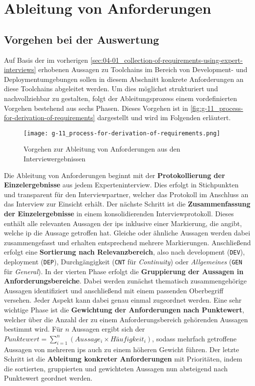 \section{Ableitung von Anforderungen}
\label{sec:04-02_derivation-of-requirements}

\subsection{Vorgehen bei der Auswertung}
\label{subsec:04-02-01_procedure-for-evaluation}

Auf Basis der im vorherigen \autoref{sec:04-01_collection-of-requirements-using-expert-interviews} erhobenen Aussagen zu Toolchains im Bereich von Development- und Deploymentumgebungen sollen in diesem Abschnitt konkrete Anforderungen an diese Toolchains abgeleitet werden. Um dies möglichst strukturiert und nachvollziehbar zu gestalten, folgt der Ableitungsprozess einem vordefinierten Vorgehen bestehend aus sechs Phasen. Dieses Vorgehen ist in \autoref{fig:g-11_process-for-derivation-of-requirements} dargestellt und wird im Folgenden erläutert.

\begin{figure}[h]
    \centering
    \texttt{[image: g-11\_process-for-derivation-of-requirements.png]}
    \caption{Vorgehen zur Ableitung von Anforderungen aus den Interviewergebnissen}
    \label{fig:g-11_process-for-derivation-of-requirements}
\end{figure}

Die Ableitung von Anforderungen beginnt mit der \textbf{Protokollierung der Einzelergebnisse} aus jedem Experteninterview. Dies erfolgt in Stichpunkten und transparent für den Interviewpartner, welcher das Protokoll im Anschluss an das Interview zur Einsicht erhält. Der nächste Schritt ist die \textbf{Zusammenfassung der Einzelergebnisse} in einem konsolidierenden Interviewprotokoll. Dieses enthält alle relevanten Aussagen der \Glspl{ip} inklusive einer Markierung, die angibt, welche \Gls{ip} die Aussage getroffen hat. Gleiche oder ähnliche Aussagen werden dabei zusammengefasst und erhalten entsprechend mehrere Markierungen. Anschließend erfolgt eine \textbf{Sortierung nach Relevanzbereich}, also nach \Gls{development} (\texttt{DEV}), \Gls{deployment} (\texttt{DEP}), Durchgängigkeit (\texttt{CNT} für \textit{Continuity}) oder \textit{Allgemeines} (\texttt{GEN} für \textit{General}). In der vierten Phase erfolgt die \textbf{Gruppierung der Aussagen in Anforderungsbereiche}. Dabei werden zunächst thematisch zusammengehörige Aussagen identifiziert und anschließend mit einem passenden Oberbegriff versehen. Jeder Aspekt kann dabei genau einmal zugeordnet werden. Eine sehr wichtige Phase ist die \textbf{Gewichtung der Anforderungen nach Punktewert}, welcher über die Anzahl der zu einem Anforderungsbereich gehörenden Aussagen bestimmt wird. Für $ n $ Aussagen ergibt sich der $ Punktewert = \sum_{i=1}^{n} (Aussage_i \times Häufigkeit_i) $, sodass mehrfach getroffene Aussagen von mehreren \Glspl{ip} auch zu einem höheren Gewicht führen. Der letzte Schritt ist die \textbf{Ableitung konkreter Anforderungen} mit Prioritäten, indem die sortierten, gruppierten und gewichteten Aussagen nun absteigend nach Punktewert geordnet werden.


